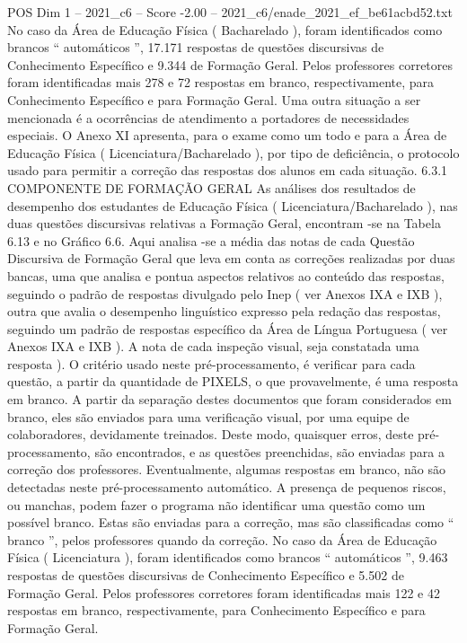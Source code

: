 \begin{textsample}{POS Dim 1 – 2021\_c6 – Score -2.00 – 2021\_c6/enade\_2021\_ef\_be61acbd52.txt}
No caso da Área de Educação Física ( Bacharelado ), foram identificados como brancos “ automáticos ”, 17.171 respostas de questões discursivas de Conhecimento Específico e 9.344 de Formação Geral.
Pelos professores corretores foram identificadas mais 278 e 72 respostas em branco, respectivamente, para Conhecimento Específico e para Formação Geral.
Uma outra situação a ser mencionada é a ocorrências de atendimento a portadores de necessidades especiais.
O Anexo XI apresenta, para o exame como um todo e para a Área de Educação Física ( Licenciatura/Bacharelado ), por tipo de deficiência, o protocolo usado para permitir a correção das respostas dos alunos em cada situação. 6.3.1 COMPONENTE DE FORMAÇÃO GERAL As análises dos resultados de desempenho dos estudantes de Educação Física ( Licenciatura/Bacharelado ), nas duas questões discursivas relativas a Formação Geral, encontram -se na Tabela 6.13 e no Gráfico 6.6.
Aqui analisa -se a média das notas de cada Questão Discursiva de Formação Geral que leva em conta as correções realizadas por duas bancas, uma que analisa e pontua aspectos relativos ao conteúdo das respostas, seguindo o padrão de respostas divulgado pelo Inep ( ver Anexos IXA e IXB ), outra que avalia o desempenho linguístico expresso pela redação das respostas, seguindo um padrão de respostas específico da Área de Língua Portuguesa ( ver Anexos IXA e IXB ).
A nota de cada inspeção visual, seja constatada uma resposta ).
O critério usado neste pré-processamento, é verificar para cada questão, a partir da quantidade de PIXELS, o que provavelmente, é uma resposta em branco.
A partir da separação destes documentos que foram considerados em branco, eles são enviados para uma verificação visual, por uma equipe de colaboradores, devidamente treinados.
Deste modo, quaisquer erros, deste pré-processamento, são encontrados, e as questões preenchidas, são enviadas para a correção dos professores.
Eventualmente, algumas respostas em branco, não são detectadas neste pré-processamento automático.
A presença de pequenos riscos, ou manchas, podem fazer o programa não identificar uma questão como um possível branco.
Estas são enviadas para a correção, mas são classificadas como “ branco ”, pelos professores quando da correção.
No caso da Área de Educação Física ( Licenciatura ), foram identificados como brancos “ automáticos ”, 9.463 respostas de questões discursivas de Conhecimento Específico e 5.502 de Formação Geral.
Pelos professores corretores foram identificadas mais 122 e 42 respostas em branco, respectivamente, para Conhecimento Específico e para Formação Geral.

\end{textsample}
